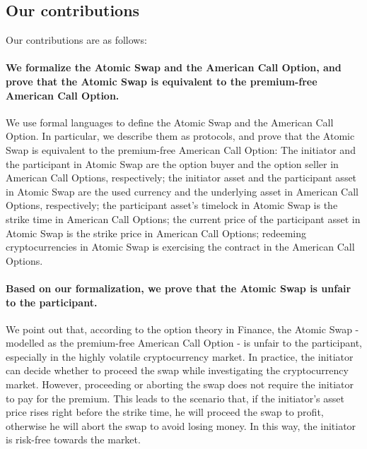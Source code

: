 \subsection{Our contributions}

Our contributions are as follows:

\paragraph{We formalize the Atomic Swap and the American Call Option, and prove that the Atomic Swap is equivalent to the premium-free American Call Option.}
We use formal languages to define the Atomic Swap and the American Call Option.
In particular, we describe them as protocols, and prove that the Atomic Swap is equivalent to the premium-free American Call Option:
The initiator and the participant in Atomic Swap are the option buyer and the option seller in American Call Options, respectively;
the initiator asset and the participant asset in Atomic Swap are the used currency and the underlying asset in American Call Options, respectively;
the participant asset's timelock in Atomic Swap is the strike time in American Call Options;
the current price of the participant asset in Atomic Swap is the strike price in American Call Options;
redeeming cryptocurrencies in Atomic Swap is exercising the contract in the American Call Options.

\paragraph{Based on our formalization, we prove that the Atomic Swap is unfair to the participant.}
We point out that, according to the option theory in Finance, the Atomic Swap - modelled as the premium-free American Call Option - is unfair to the participant, especially in the highly volatile cryptocurrency market.
In practice, the initiator can decide whether to proceed the swap while investigating the cryptocurrency market.
However, proceeding or aborting the swap does not require the initiator to pay for the premium.
This leads to the scenario that, if the initiator's asset price rises right before the strike time, he will proceed the swap to profit, otherwise he will abort the swap to avoid losing money.
In this way, the initiator is risk-free towards the market.

